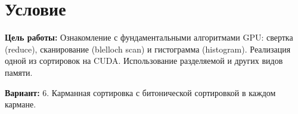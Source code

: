 \section{Условие}
\textbf{Цель работы:} Ознакомление с фундаментальными алгоритмами GPU: свертка (reduce), сканирование (blelloch scan) и гистограмма (histogram). Реализация одной из сортировок на CUDA. Использование разделяемой и других видов памяти.

\textbf{Вариант:} 6. Карманная сортировка с битонической сортировкой в каждом кармане.
